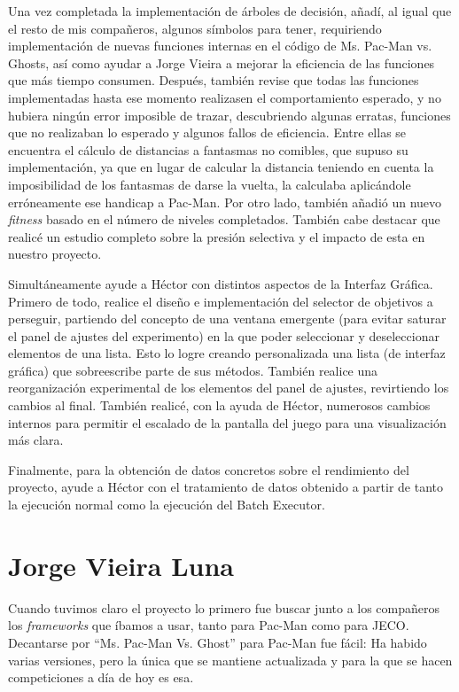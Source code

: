 Una vez completada la implementación de árboles de decisión, añadí, al igual que el resto de mis compañeros, algunos símbolos para tener, requiriendo implementación de nuevas funciones internas en el código de Ms. Pac-Man vs. Ghosts, así como ayudar a Jorge Vieira a mejorar la eficiencia de las funciones que más tiempo consumen. Después, también revise que todas las funciones implementadas hasta ese momento realizasen el comportamiento esperado, y no hubiera ningún error imposible de trazar, descubriendo algunas erratas, funciones que no realizaban lo esperado y algunos fallos de eficiencia. Entre ellas se encuentra el cálculo de distancias a fantasmas no comibles, que supuso su implementación, ya que en lugar de calcular la distancia teniendo en cuenta la imposibilidad de los fantasmas de darse la vuelta, la calculaba aplicándole erróneamente ese handicap a Pac-Man. Por otro lado, también añadió un nuevo \textit{fitness} basado en el número de niveles completados. También cabe destacar que realicé un estudio completo sobre la presión selectiva y el impacto de esta en nuestro proyecto.
 
Simultáneamente ayude a Héctor con distintos aspectos de la Interfaz Gráfica. Primero de todo, realice el diseño e implementación del selector de objetivos a perseguir, partiendo del concepto de una ventana emergente (para evitar saturar el panel de ajustes del experimento) en la que poder seleccionar y deseleccionar elementos de una lista. Esto lo logre creando personalizada una lista (de interfaz gráfica) que sobreescribe parte de sus métodos. También realice una reorganización experimental de los elementos del panel de ajustes, revirtiendo los cambios al final. También realicé, con la ayuda de Héctor, numerosos cambios internos para permitir el escalado de la pantalla del juego para una visualización más clara.
 
Finalmente, para la obtención de datos concretos sobre el rendimiento del proyecto, ayude a Héctor con el tratamiento de datos obtenido a partir de tanto la ejecución normal como la ejecución del Batch Executor.


\section{Jorge Vieira Luna}
Cuando tuvimos claro el proyecto lo primero fue buscar junto a los compañeros los \textit{frameworks} que íbamos a usar, tanto para Pac-Man como para JECO. Decantarse por ``Ms. Pac-Man Vs. Ghost'' para Pac-Man fue fácil: Ha habido varias versiones, pero la única que se mantiene actualizada y para la que se hacen competiciones a día de hoy es esa.

